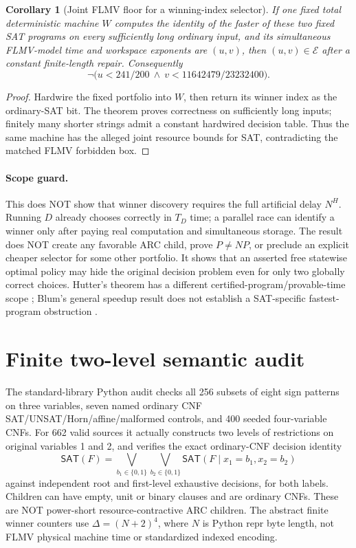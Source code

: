 \documentclass[11pt]{article}
\newcommand{\SAT}{\mathsf{SAT}}
\newtheorem{corollary}[theorem]{Corollary}
\begin{document}
\begin{corollary}[Joint FLMV floor for a winning-index selector]
If one fixed total deterministic machine \(W\) computes the identity of the faster of these two fixed SAT programs on every sufficiently long ordinary input, and its simultaneous FLMV-model time and workspace exponents are \((u,v)\), then \((u,v)\in\mathcal E\) after a constant finite-length repair. Consequently
\[
\boxed{\neg\bigl(u<241/200\ \wedge\ v<11642479/23232400\bigr).}
\]
\end{corollary}
\begin{proof}
Hardwire the fixed portfolio into \(W\), then return its winner index as the ordinary-SAT bit. The theorem proves correctness on sufficiently long inputs; finitely many shorter strings admit a constant hardwired decision table. Thus the same machine has the alleged joint resource bounds for SAT, contradicting the matched FLMV forbidden box.
\end{proof}

\paragraph{Scope guard.}
This does NOT show that winner discovery requires the full artificial delay \(N^H\). Running \(D\) already chooses correctly in \(T_D\) time; a parallel race can identify a winner only after paying real computation and simultaneous storage. The result does NOT create any favorable ARC child, prove \(P\ne NP\), or preclude an explicit cheaper selector for some other portfolio. It shows that an asserted free statewise optimal policy may hide the original decision problem even for only two globally correct choices. Hutter's theorem has a different certified-program/provable-time scope \cite{hutter}; Blum's general speedup result does not establish a SAT-specific fastest-program obstruction \cite{blum}.

\section{Finite two-level semantic audit}
The standard-library Python audit checks all 256 subsets of eight sign patterns on three variables, seven named ordinary CNF SAT/UNSAT/Horn/affine/malformed controls, and 400 seeded four-variable CNFs. For 662 valid sources it actually constructs two levels of restrictions on original variables 1 and 2, and verifies the exact ordinary-CNF decision identity
\[
\SAT(F)=\bigvee_{b_1\in\{0,1\}}\bigvee_{b_2\in\{0,1\}}
\SAT(F\mid x_1=b_1,x_2=b_2)
\]
against independent root and first-level exhaustive decisions, for both labels. Children can have empty, unit or binary clauses and are ordinary CNFs. These are NOT power-short resource-contractive ARC children. The abstract finite winner counters use \(\Delta=(N+2)^4\), where \(N\) is Python repr byte length, not FLMV physical machine time or standardized indexed encoding.
\end{document}
